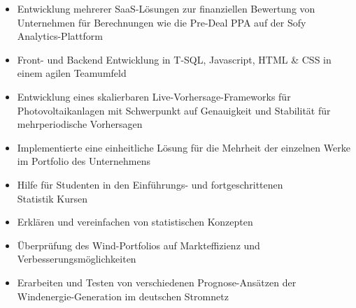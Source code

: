 \documentclass[9pt,a4paper,ragged2e]{altacv}
\begin{document}
    \medskip\medskip\medskip


    \begin{itemize}
        \item Entwicklung mehrerer SaaS-Lösungen zur finanziellen Bewertung von \\ Unternehmen für Berechnungen wie die Pre-Deal PPA auf der Sofy \\ Analytics-Plattform
        \item Front- und Backend Entwicklung in T-SQL, Javascript, HTML & CSS in einem agilen Teamumfeld
    \end{itemize}

    \divider

    \begin{itemize}
        \item Entwicklung eines skalierbaren Live-Vorhersage-Frameworks für \\ Photovoltaikanlagen mit Schwerpunkt auf Genauigkeit und Stabilität für mehrperiodische Vorhersagen
        \item Implementierte eine einheitliche Lösung für die Mehrheit der einzelnen Werke im Portfolio des Unternehmens
    \end{itemize}

    \divider

    \begin{itemize}
        \item Hilfe für Studenten in den Einführungs- und fortgeschrittenen \\ Statistik Kursen
        \item Erklären und vereinfachen von statistischen Konzepten
    \end{itemize}

    \divider

    \begin{itemize}
        \item Überprüfung des Wind-Portfolios auf Markteffizienz und \\ Verbesserungsmöglichkeiten
        \item Erarbeiten und Testen von verschiedenen Prognose-Ansätzen der Windenergie-Generation im deutschen Stromnetz
    \end{itemize}
\end{document}
